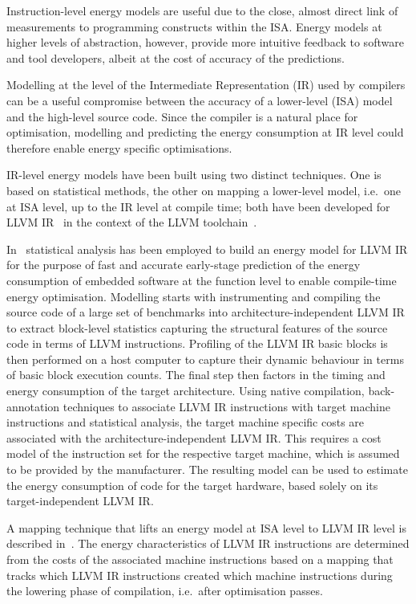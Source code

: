 Instruction-level energy models are 
useful 
due to the close, almost direct
link of measurements to programming constructs within the ISA. Energy models at
higher levels of abstraction, however, provide more intuitive feedback to
software and tool developers, 
albeit 
at the cost of accuracy of the
predictions. 

Modelling at the level of the Intermediate Representation (IR) used by
compilers can be a useful compromise between the accuracy of a lower-level
(ISA) model and the high-level source code. Since the compiler is a natural
place for optimisation, modelling and predicting the energy consumption at IR
level could therefore enable energy specific optimisations.

IR-level energy models have been built using two distinct techniques. One is
based on statistical methods, the other on mapping a lower-level model, i.e.\
one at ISA level, up to the IR level at compile time; both have been developed
for LLVM IR~\cite{LattnerLLVM2004} in the context of the LLVM
toolchain~\cite{LLVM}.

In~\cite{Brandolese2011} statistical analysis has been employed to build an
energy model for LLVM IR for the purpose of fast and accurate early-stage
prediction of the energy consumption of embedded software at the function level
to enable compile-time energy optimisation.
%
Modelling starts with instrumenting and compiling the source code of a large
set of benchmarks into architecture-independent LLVM IR to extract block-level
statistics capturing the structural features of the source code in terms of
LLVM instructions. 
%
Profiling of the LLVM IR basic blocks is then performed on a host computer to
capture their dynamic behaviour in terms of basic block execution counts. 
%
The final step then factors in the timing and energy consumption of the target
architecture. Using native compilation, back-annotation techniques to associate
LLVM IR instructions with target machine instructions and statistical analysis,
the target machine specific costs are associated with the
architecture-independent LLVM IR. This requires a cost model of the instruction
set for the respective target machine, which is assumed to be provided by the
manufacturer. The resulting model can be used to estimate the energy
consumption of code for the target hardware, based solely on its
target-independent LLVM IR.

A 
mapping technique that lifts an energy model at ISA level to LLVM IR
level is described in~\cite{Georgiou15}. The energy characteristics of LLVM IR
instructions are determined from the costs of the associated machine
instructions based on a mapping that tracks which LLVM IR instructions created
which machine instructions during the lowering phase of compilation, i.e.\
after optimisation passes. 

